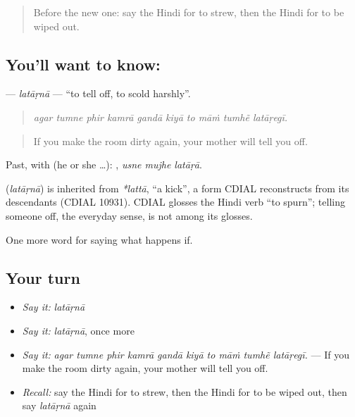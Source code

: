\label{lesson:HI-C385-latarna}



\begin{quote}
Before the new one: say the Hindi for to strew, then the Hindi for to be wiped out.
\end{quote}

\subsection*{You'll want to know: }
\textbf{} — \emph{latāṛnā} — \textquotedblleft{}to tell off, to scold harshly\textquotedblright{}.

\begin{quote}
         
\end{quote}

\begin{quote}
\emph{agar tumne phir kamrā gandā kiyā to māṁ tumhẽ latāṛegī.}
\end{quote}

\begin{quote}
If you make the room dirty again, your mother will tell you off.
\end{quote}

Past, with  (he or she …):   , \emph{usne mujhe latāṛā}.

\begin{cousinweb}
\textbf{} (\emph{latāṛnā}) is inherited from \emph{*lattā}, \textquotedblleft{}a kick\textquotedblright{}, a form CDIAL reconstructs from its descendants (CDIAL 10931). CDIAL glosses the Hindi verb \textquotedblleft{}to spurn\textquotedblright{}; telling someone off, the everyday sense, is not among its glosses.
\end{cousinweb}

\begin{grammarlens}[title={What you've built}]
One more word for saying what happens if.
\end{grammarlens}

\subsection*{Your turn}
\begin{itemize}
\raggedright
  \item \emph{Say it:} \emph{latāṛnā}
  \item \emph{Say it:} \emph{latāṛnā}, once more
  \item \emph{Say it:} \emph{agar tumne phir kamrā gandā kiyā to māṁ tumhẽ latāṛegī.} — If you make the room dirty again, your mother will tell you off.
  \item \emph{Recall:} say the Hindi for to strew, then the Hindi for to be wiped out, then say \emph{latāṛnā} again
\end{itemize}

